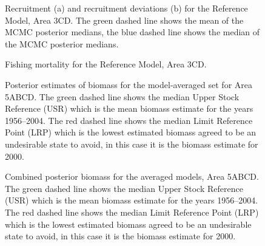 \documentclass[11pt]{book}
\begin{document}
\begin{figure}[htb]

{\centering {} 

}

\caption{Recruitment (a) and recruitment deviations (b) for the Reference Model, Area 3CD.  The green dashed line shows the mean of the MCMC posterior medians, the blue dashed line shows the median of the MCMC posterior medians.}\label{fig:fig-base-recr-3cd}
\end{figure}
\begin{figure}[htb]

{\centering {} 

}

\caption{Fishing mortality for the Reference Model, Area 3CD.}\label{fig:fig-base-f-3cd}
\end{figure}
\clearpage
\begin{figure}[htb]

{\centering {} 

}

\caption{Posterior estimates of biomass for the model-averaged set for Area 5ABCD. The green dashed line shows the median Upper Stock Reference (USR) which is the mean biomass estimate for the years 1956--2004. The red dashed line shows the median Limit Reference Point (LRP) which is the lowest estimated biomass agreed to be an undesirable state to avoid, in this case it is the biomass estimate for 2000.}\label{fig:fig-model-average-biomass-comp-5abcd}
\end{figure}
\begin{figure}[htb]

{\centering {} 

}

\caption{Combined posterior biomass for the averaged models, Area 5ABCD. The green dashed line shows the median Upper Stock Reference (USR) which is the mean biomass estimate for the years 1956--2004. The red dashed line shows the median Limit Reference Point (LRP) which is the lowest estimated biomass agreed to be an undesirable state to avoid, in this case it is the biomass estimate for 2000.}\label{fig:fig-model-average-biomass-5abcd}
\end{figure}
\end{document}
